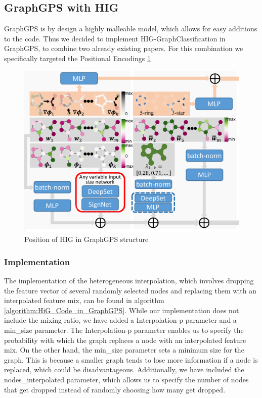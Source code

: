 \subsection{GraphGPS with HIG}
\label{sec:graphgps_hig}
GraphGPS is by design a highly malleable model, which allows for easy additions to the code. Thus we decided to implement HIG-GraphClassification in GraphGPS, to combine two already existing papers. For this combination we specifically targeted the Positional Encodings \ref{fig:gps-hig-position}

\begin{figure}[ht]
    \centering
    \includegraphics[scale=0.2]{tex/res/gps_hig_position.png}
    \caption{Position of HIG in GraphGPS structure}
    \label{fig:gps-hig-position}
\end{figure}

\subsubsection{Implementation}

The implementation of the heterogeneous interpolation, which involves dropping the feature vector of several randomly selected nodes and replacing them with an interpolated feature mix, can be found in algorithm \ref{algorithm:HiG_Code_in_GraphGPS}. While our implementation does not include the mixing ratio, we have added a Interpolation-p parameter and a min\_size parameter. The Interpolation-p parameter enables us to specify the probability with which the graph replaces a node with an interpolated feature mix. On the other hand, the min\_size parameter sets a minimum size for the graph. This is because a smaller graph tends to lose more information if a node is replaced, which could be disadvantageous. Additionally, we have included the nodes\_interpolated parameter, which allows us to specify the number of nodes that get dropped instead of randomly choosing how many get dropped.

